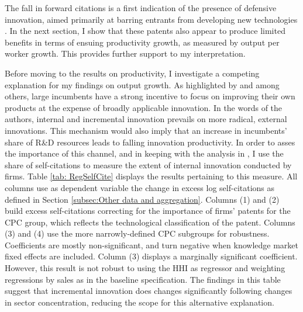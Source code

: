 The fall in forward citations is a first indication of the presence
of defensive innovation, aimed primarily at barring entrants from
developing new technologies \citep[see, e.g.,][]{guellecPreemptivePatentingSecuring2012}.
In the next section, I show that these patents also appear to produce
limited benefits in terms of ensuing productivity growth, as measured
by output per worker growth. This provides further support to my interpretation.

Before moving to the results on productivity, I investigate a competing
explanation for my findings on output growth. As highlighted by \citet{acemogluRadicalIncrementalInnovationForthcoming}
and \citet{akcigitGrowthHeterogeneousInnovations2018} among others,
large incumbents have a strong incentive to focus on improving their
own products at the expense of broadly applicable innovation. In the
words of the authors, internal and incremental innovation prevails
on more radical, external innovations. This mechanism would also imply
that an increase in incumbents' share of R\&D resources leads to falling
innovation productivity. In order to asses the importance of this
channel, and in keeping with the analysis in \citet{akcigitGrowthHeterogeneousInnovations2018},
I use the share of self-citations to measure the extent of internal
innovation conducted by firms. Table \ref{tab: RegSelfCite} displays
the results pertaining to this measure. All columns use as dependent
variable the change in excess log self-citations as defined in Section
\ref{subsec:Other data and aggregation}. Columns (1) and (2) build
excess self-citations correcting for the importance of firms' patents
for the CPC group, which reflects the technological classification
of the patent. Columns (3) and (4) use the more narrowly-defined CPC
subgroups for robustness. Coefficients are mostly non-significant,
and turn negative when knowledge market fixed effects are included.
Column (3) displays a marginally significant coefficient. However,
this result is not robust to using the HHI as regressor and weighting
regressions by sales as in the baseline specification. The findings
in this table suggest that incremental innovation does changes significantly
following changes in sector concentration, reducing the scope for
this alternative explanation. 

